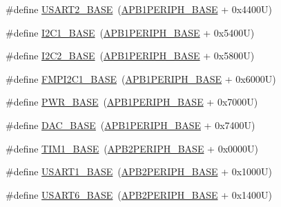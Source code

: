\begin{DoxyCompactItemize}
\item 
\#define \hyperlink{group___peripheral__registers__structures_gade83162a04bca0b15b39018a8e8ec090}{U\+S\+A\+R\+T2\+\_\+\+B\+A\+SE}~(\hyperlink{group___peripheral__memory__map_ga45666d911f39addd4c8c0a0ac3388cfb}{A\+P\+B1\+P\+E\+R\+I\+P\+H\+\_\+\+B\+A\+SE} + 0x4400\+U)
\item 
\#define \hyperlink{group___peripheral__registers__structures_gacd72dbffb1738ca87c838545c4eb85a3}{I2\+C1\+\_\+\+B\+A\+SE}~(\hyperlink{group___peripheral__memory__map_ga45666d911f39addd4c8c0a0ac3388cfb}{A\+P\+B1\+P\+E\+R\+I\+P\+H\+\_\+\+B\+A\+SE} + 0x5400\+U)
\item 
\#define \hyperlink{group___peripheral__registers__structures_ga04bda70f25c795fb79f163b633ad4a5d}{I2\+C2\+\_\+\+B\+A\+SE}~(\hyperlink{group___peripheral__memory__map_ga45666d911f39addd4c8c0a0ac3388cfb}{A\+P\+B1\+P\+E\+R\+I\+P\+H\+\_\+\+B\+A\+SE} + 0x5800\+U)
\item 
\#define \hyperlink{group___peripheral__registers__structures_gac6e36f905b89086de0fceda4325a9a8e}{F\+M\+P\+I2\+C1\+\_\+\+B\+A\+SE}~(\hyperlink{group___peripheral__memory__map_ga45666d911f39addd4c8c0a0ac3388cfb}{A\+P\+B1\+P\+E\+R\+I\+P\+H\+\_\+\+B\+A\+SE} + 0x6000\+U)
\item 
\#define \hyperlink{group___peripheral__registers__structures_gac691ec23dace8b7a649a25acb110217a}{P\+W\+R\+\_\+\+B\+A\+SE}~(\hyperlink{group___peripheral__memory__map_ga45666d911f39addd4c8c0a0ac3388cfb}{A\+P\+B1\+P\+E\+R\+I\+P\+H\+\_\+\+B\+A\+SE} + 0x7000\+U)
\item 
\#define \hyperlink{group___peripheral__registers__structures_gad18d0b914c7f68cecbee1a2d23a67d38}{D\+A\+C\+\_\+\+B\+A\+SE}~(\hyperlink{group___peripheral__memory__map_ga45666d911f39addd4c8c0a0ac3388cfb}{A\+P\+B1\+P\+E\+R\+I\+P\+H\+\_\+\+B\+A\+SE} + 0x7400\+U)
\item 
\#define \hyperlink{group___peripheral__registers__structures_gaf8aa324ca5011b8173ab16585ed7324a}{T\+I\+M1\+\_\+\+B\+A\+SE}~(\hyperlink{group___peripheral__memory__map_ga25b99d6065f1c8f751e78f43ade652cb}{A\+P\+B2\+P\+E\+R\+I\+P\+H\+\_\+\+B\+A\+SE} + 0x0000\+U)
\item 
\#define \hyperlink{group___peripheral__registers__structures_ga86162ab3f740db9026c1320d46938b4d}{U\+S\+A\+R\+T1\+\_\+\+B\+A\+SE}~(\hyperlink{group___peripheral__memory__map_ga25b99d6065f1c8f751e78f43ade652cb}{A\+P\+B2\+P\+E\+R\+I\+P\+H\+\_\+\+B\+A\+SE} + 0x1000\+U)
\item 
\#define \hyperlink{group___peripheral__registers__structures_gade4d3907fd0387ee832f426f52d568bb}{U\+S\+A\+R\+T6\+\_\+\+B\+A\+SE}~(\hyperlink{group___peripheral__memory__map_ga25b99d6065f1c8f751e78f43ade652cb}{A\+P\+B2\+P\+E\+R\+I\+P\+H\+\_\+\+B\+A\+SE} + 0x1400\+U)

\end{DoxyCompactItemize}
